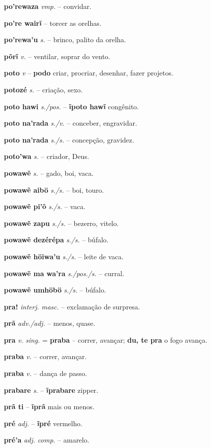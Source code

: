 \textbf{po'rewaza} \textit{vmp.} -- convidar.

\textbf{po're wairĩ} \textit{} -- torcer as orelhas.

\textbf{po'rewa'u} \textit{s.} -- brinco, palito da orelha.

\textbf{põrĩ} \textit{v.} -- ventilar, soprar do vento.

\textbf{poto} \textit{v} -- \textbf{podo} criar, procriar, desenhar, fazer projetos.

\textbf{potozé} \textit{s.} -- criação, sexo.

\textbf{poto hawi} \textit{s./pos.} -- \textbf{ĩpoto hawĩ} congênito.

\textbf{poto na'rada} \textit{s./v.} -- conceber, engravidar.

\textbf{poto na'rada} \textit{s./s.} -- concepção, gravidez.

\textbf{poto'wa} \textit{s.} -- criador, Deus.

\textbf{powawẽ} \textit{s.} -- gado, boi, vaca.

\textbf{powawẽ aibö} \textit{s./s.} -- boi, touro.

\textbf{powawẽ pi'õ} \textit{s./s.} -- vaca.

\textbf{powawẽ zapu} \textit{s./s.} -- bezerro, vitelo.

\textbf{powawẽ dezérépa} \textit{s./s.} -- búfalo.

\textbf{powawẽ höiwa'u} \textit{s./s.} -- leite de vaca.

\textbf{powawẽ ma wa'ra} \textit{s./pos./s.} -- curral.

\textbf{powawẽ umhöbö} \textit{s./s.} -- búfalo.

\textbf{pra!} \textit{interj. masc.} -- exclamação de surpresa.

\textbf{prã} \textit{adv./adj.} -- menos, quase.

\textbf{pra} \textit{v. sing.} = \textbf{praba} -- correr, avançar; \textbf{du, te pra} o fogo avança.

\textbf{praba} \textit{v.} -- correr, avançar.

\textbf{praba} \textit{v.} -- dança de passo.

\textbf{prabare} \textit{s.} -- \textbf{ĩprabare} zipper.

\textbf{prã ti} -- \textbf{ĩprã} mais ou menos.

\textbf{pré} \textit{adj.} -- \textbf{ĩpré} vermelho.

\textbf{pré'a} \textit{adj. comp.} -- amarelo.

